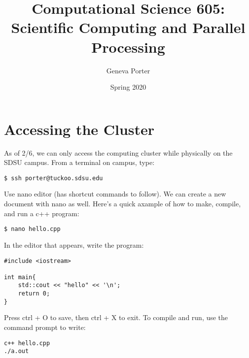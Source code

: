 \documentclass{article}
\title{Computational Science 605: \\ Scientific Computing and Parallel Processing}
\author{Geneva Porter}
\date{Spring 2020}
\begin{document}
\maketitle

\section{Accessing the Cluster}

As of 2/6, we can only access the computing cluster while physically on the SDSU campus. From a terminal on campus, type:

\begin{verbatim}
$ ssh porter@tuckoo.sdsu.edu
\end{verbatim}

\noindent Use nano editor (has shortcut commands to follow). We can create a new document with nano as well. Here's a quick axample of how to make, compile, and run a c++ program:

\begin{verbatim}
$ nano hello.cpp
\end{verbatim}

\noindent In the editor that appears, write the program:

\begin{verbatim}
#include <iostream>

int main{
    std::cout << "hello" << '\n';
    return 0;
}
\end{verbatim}

\noindent Press ctrl + O to save, then ctrl + X to exit. To compile and run, use the command prompt to write:

\begin{verbatim}
c++ hello.cpp
./a.out
\end{verbatim}
\end{document}
